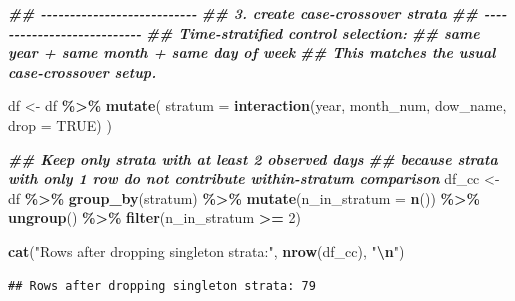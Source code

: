 \documentclass[
]{article}
\newenvironment{Shaded}{\begin{snugshade}}{\end{snugshade}}
\newcommand{\AttributeTok}[1]{\textcolor[rgb]{0.13,0.29,0.53}{#1}}
\newcommand{\ConstantTok}[1]{\textcolor[rgb]{0.56,0.35,0.01}{#1}}
\newcommand{\DecValTok}[1]{\textcolor[rgb]{0.00,0.00,0.81}{#1}}
\newcommand{\DocumentationTok}[1]{\textcolor[rgb]{0.56,0.35,0.01}{\textbf{\textit{#1}}}}
\newcommand{\FunctionTok}[1]{\textcolor[rgb]{0.13,0.29,0.53}{\textbf{#1}}}
\newcommand{\NormalTok}[1]{#1}
\newcommand{\OtherTok}[1]{\textcolor[rgb]{0.56,0.35,0.01}{#1}}
\newcommand{\SpecialCharTok}[1]{\textcolor[rgb]{0.81,0.36,0.00}{\textbf{#1}}}
\newcommand{\StringTok}[1]{\textcolor[rgb]{0.31,0.60,0.02}{#1}}
\begin{document}
\begin{Shaded}
\begin{Highlighting}[]
\DocumentationTok{\#\# {-}{-}{-}{-}{-}{-}{-}{-}{-}{-}{-}{-}{-}{-}{-}{-}{-}{-}{-}{-}{-}{-}{-}{-}{-}{-}{-}}
\DocumentationTok{\#\# 3. create case{-}crossover strata}
\DocumentationTok{\#\# {-}{-}{-}{-}{-}{-}{-}{-}{-}{-}{-}{-}{-}{-}{-}{-}{-}{-}{-}{-}{-}{-}{-}{-}{-}{-}{-}}
\DocumentationTok{\#\# Time{-}stratified control selection:}
\DocumentationTok{\#\# same year + same month + same day of week}
\DocumentationTok{\#\# This matches the usual case{-}crossover setup.}

\NormalTok{df }\OtherTok{\textless{}{-}}\NormalTok{ df }\SpecialCharTok{\%\textgreater{}\%}
  \FunctionTok{mutate}\NormalTok{(}
    \AttributeTok{stratum =} \FunctionTok{interaction}\NormalTok{(year, month\_num, dow\_name, }\AttributeTok{drop =} \ConstantTok{TRUE}\NormalTok{)}
\NormalTok{  )}

\DocumentationTok{\#\# Keep only strata with at least 2 observed days}
\DocumentationTok{\#\# because strata with only 1 row do not contribute within{-}stratum comparison}
\NormalTok{df\_cc }\OtherTok{\textless{}{-}}\NormalTok{ df }\SpecialCharTok{\%\textgreater{}\%}
  \FunctionTok{group\_by}\NormalTok{(stratum) }\SpecialCharTok{\%\textgreater{}\%}
  \FunctionTok{mutate}\NormalTok{(}\AttributeTok{n\_in\_stratum =} \FunctionTok{n}\NormalTok{()) }\SpecialCharTok{\%\textgreater{}\%}
  \FunctionTok{ungroup}\NormalTok{() }\SpecialCharTok{\%\textgreater{}\%}
  \FunctionTok{filter}\NormalTok{(n\_in\_stratum }\SpecialCharTok{\textgreater{}=} \DecValTok{2}\NormalTok{)}

\FunctionTok{cat}\NormalTok{(}\StringTok{"Rows after dropping singleton strata:"}\NormalTok{, }\FunctionTok{nrow}\NormalTok{(df\_cc), }\StringTok{"}\SpecialCharTok{\textbackslash{}n}\StringTok{"}\NormalTok{)}
\end{Highlighting}
\end{Shaded}

\begin{verbatim}
## Rows after dropping singleton strata: 79
\end{verbatim}

\begin{Shaded}
\end{Shaded}
\end{document}
